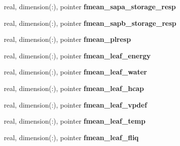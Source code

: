 \begin{DoxyCompactItemize}
\item 
\hypertarget{structed__state__vars_1_1patchtype_aa3b8a60afbb0eba277ff8a53ffd5059b}{
real, dimension(:), pointer {\bfseries fmean\_\-sapa\_\-storage\_\-resp}}
\label{structed__state__vars_1_1patchtype_aa3b8a60afbb0eba277ff8a53ffd5059b}

\item 
\hypertarget{structed__state__vars_1_1patchtype_aec3dfd1d9f7f9ef2b1109faf97e1be67}{
real, dimension(:), pointer {\bfseries fmean\_\-sapb\_\-storage\_\-resp}}
\label{structed__state__vars_1_1patchtype_aec3dfd1d9f7f9ef2b1109faf97e1be67}

\item 
\hypertarget{structed__state__vars_1_1patchtype_a7f53d4ffc6c0a0b2ca8f14575a375c67}{
real, dimension(:), pointer {\bfseries fmean\_\-plresp}}
\label{structed__state__vars_1_1patchtype_a7f53d4ffc6c0a0b2ca8f14575a375c67}

\item 
\hypertarget{structed__state__vars_1_1patchtype_ae2af1c571459b7e3c837231a21b788e4}{
real, dimension(:), pointer {\bfseries fmean\_\-leaf\_\-energy}}
\label{structed__state__vars_1_1patchtype_ae2af1c571459b7e3c837231a21b788e4}

\item 
\hypertarget{structed__state__vars_1_1patchtype_a7b2dfe197d6370bfd09bf196dc24ce4c}{
real, dimension(:), pointer {\bfseries fmean\_\-leaf\_\-water}}
\label{structed__state__vars_1_1patchtype_a7b2dfe197d6370bfd09bf196dc24ce4c}

\item 
\hypertarget{structed__state__vars_1_1patchtype_a110e59329ff885afb4d0bba262d71e52}{
real, dimension(:), pointer {\bfseries fmean\_\-leaf\_\-hcap}}
\label{structed__state__vars_1_1patchtype_a110e59329ff885afb4d0bba262d71e52}

\item 
\hypertarget{structed__state__vars_1_1patchtype_ad816e97c8b93f8574f78d1e60b182ee6}{
real, dimension(:), pointer {\bfseries fmean\_\-leaf\_\-vpdef}}
\label{structed__state__vars_1_1patchtype_ad816e97c8b93f8574f78d1e60b182ee6}

\item 
\hypertarget{structed__state__vars_1_1patchtype_a4e37517c71202ec581aeb117e6286a71}{
real, dimension(:), pointer {\bfseries fmean\_\-leaf\_\-temp}}
\label{structed__state__vars_1_1patchtype_a4e37517c71202ec581aeb117e6286a71}

\item 
\hypertarget{structed__state__vars_1_1patchtype_ae3cd71ed2413b0e13a691d224b2eb9c6}{
real, dimension(:), pointer {\bfseries fmean\_\-leaf\_\-fliq}}
\label{structed__state__vars_1_1patchtype_ae3cd71ed2413b0e13a691d224b2eb9c6}


\end{DoxyCompactItemize}
